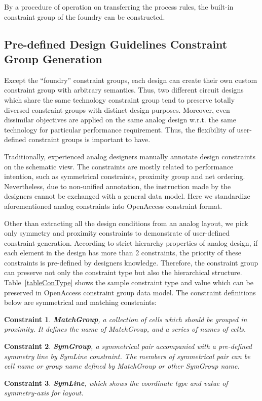      By a procedure of operation on transferring the process rules, the built-in constraint group of the foundry can be constructed.

    \subsection{Pre-defined Design Guidelines Constraint Group Generation}\label{sec:PreDesignCG}
      
      Except the ``foundry'' constraint groups, each design can create their own custom constraint group with arbitrary semantics. Thus, two different circuit designs which share the same technology constraint group tend to preserve totally diversed constraint groups with distinct design purposes. Moreover, even dissimilar objectives are applied on the same analog design w.r.t. the same technology for particular performance requirement. Thus, the flexibility of user-defined constraint groups is important to have. 

      Traditionally, experienced analog designers manually annotate design constraints on the schematic view. The constraints are mostly related to performance intention, such as symmetrical constraints, proximity group and net ordering. Nevertheless, due to non-unified annotation, the instruction made by the designers cannot be exchanged with a general data model. Here we standardize aforementioned analog constraints into OpenAccess constraint format. 
    
      Other than extracting all the design conditions from an analog layout, we pick only symmetry and proximity constraints to demonstrate of user-defined constraint generation. According to strict hierarchy properties of analog design, if each element in the design has more than 2 constraints, the priority of these constraints is pre-defined by designers knowledge. Therefore, the constraint group can preserve not only the constraint type but also the hierarchical structure. Table~\ref{tableConType} shows the sample constraint type and value which can be preserved in OpenAccess constraint group data model. The constraint definitions below are symmetrical and matching constraints: 


      \newtheorem{Cons}{Constraint}
      \begin{Cons}
        {\bf MatchGroup}, a collection of cells which should be grouped in proximity. It defines the name of MatchGroup, and a series of names of cells.
      \end{Cons}
      \begin{Cons}
        {\bf SymGroup}, a symmetrical pair accompanied with a pre-defined symmetry line by SymLine constraint. The members of symmetrical pair can be cell name or group name defined by MatchGroup or other SymGroup name.
      \end{Cons}
      \begin{Cons}
        {\bf SymLine}, which shows the coordinate type and value of symmetry-axis for layout.
      \end{Cons}
    
